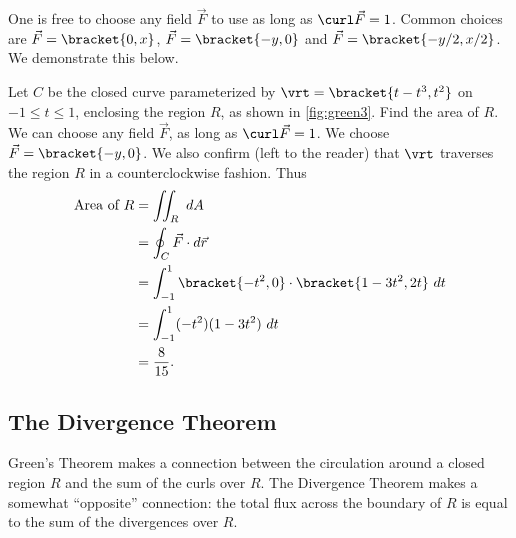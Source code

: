 One is free to choose any field $\vec F$ to use as long as $\curl\vec F = 1$. Common choices are $\vec F =\bracket{0,x}$, $\vec F =\bracket{-y,0}$ and $\vec F =\bracket{-y/2,x/2}$. We demonstrate this below.


\begin{example}\label{ex_green3}
Let $C$ be the closed curve parameterized by $\vrt =\bracket{t-t^3,t^2}$ on $-1\leq t\leq 1$, enclosing the region $R$, as shown in \autoref{fig:green3}. Find the area of $R$.%
\solution
We can choose any field $\vec F$, as long as $\curl \vec F = 1$. We choose $\vec F =\bracket{-y,0}$. We also confirm (left to the reader) that $\vrt$ traverses the region $R$ in a counterclockwise fashion. Thus
\begin{align*}
	\text{Area of $R$}
	&= \iint_R\ dA \\
	&= \oint_C \vec F\cdot d\vec r\\
	&= \int_{-1}^1\bracket{-t^2,0}\cdot\bracket{1-3t^2,2t}\ dt\\
	&= \int_{-1}^1 (-t^2)(1-3t^2)\ dt \\
	&= \frac8{15}.
\end{align*}
\end{example}

\subsection{The Divergence Theorem}

Green's Theorem makes a connection between the circulation around a closed region $R$ and the sum of the curls over $R$. The Divergence Theorem makes a somewhat ``opposite'' connection: the total flux across the boundary of $R$ is equal to the sum of the divergences over $R$. 

